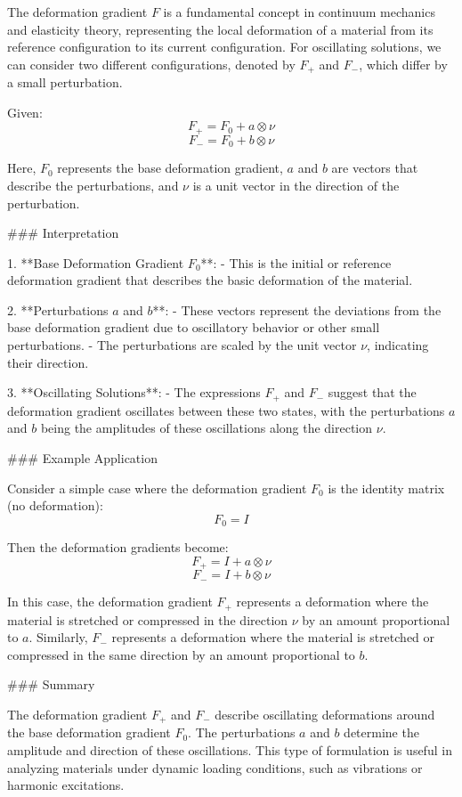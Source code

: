The deformation gradient \( F \) is a fundamental concept in continuum mechanics and elasticity theory, representing the local deformation of a material from its reference configuration to its current configuration. For oscillating solutions, we can consider two different configurations, denoted by \( F_+ \) and \( F_- \), which differ by a small perturbation.

Given:
\[ F_+ = F_0 + a \otimes \nu \]
\[ F_- = F_0 + b \otimes \nu \]

Here, \( F_0 \) represents the base deformation gradient, \( a \) and \( b \) are vectors that describe the perturbations, and \( \nu \) is a unit vector in the direction of the perturbation.

### Interpretation

1. **Base Deformation Gradient \( F_0 \)**:
   - This is the initial or reference deformation gradient that describes the basic deformation of the material.
   
2. **Perturbations \( a \) and \( b \)**:
   - These vectors represent the deviations from the base deformation gradient due to oscillatory behavior or other small perturbations.
   - The perturbations are scaled by the unit vector \( \nu \), indicating their direction.

3. **Oscillating Solutions**:
   - The expressions \( F_+ \) and \( F_- \) suggest that the deformation gradient oscillates between these two states, with the perturbations \( a \) and \( b \) being the amplitudes of these oscillations along the direction \( \nu \).

### Example Application

Consider a simple case where the deformation gradient \( F_0 \) is the identity matrix (no deformation):
\[ F_0 = I \]

Then the deformation gradients become:
\[ F_+ = I + a \otimes \nu \]
\[ F_- = I + b \otimes \nu \]

In this case, the deformation gradient \( F_+ \) represents a deformation where the material is stretched or compressed in the direction \( \nu \) by an amount proportional to \( a \). Similarly, \( F_- \) represents a deformation where the material is stretched or compressed in the same direction by an amount proportional to \( b \).

### Summary

The deformation gradient \( F_+ \) and \( F_- \) describe oscillating deformations around the base deformation gradient \( F_0 \). The perturbations \( a \) and \( b \) determine the amplitude and direction of these oscillations. This type of formulation is useful in analyzing materials under dynamic loading conditions, such as vibrations or harmonic excitations.